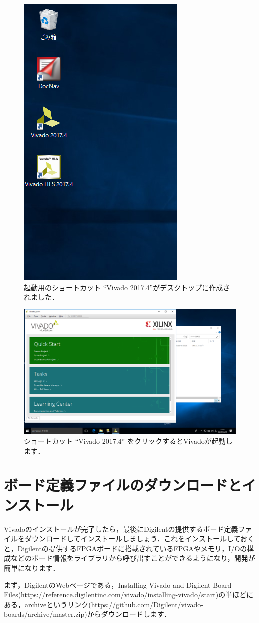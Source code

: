 \documentclass[a4paper,dvipdfmx]{jsarticle}
\begin{document}
 \begin{figure}[H]
  \begin{center}
   \includegraphics[width=.3\textwidth]{appendix_figures/17_installed_vivado.png}
   \caption{起動用のショートカット ``Vivado 2017.4''がデスクトップに作成されました．}
  \end{center}
 \end{figure}

 \begin{figure}[H]
  \begin{center}
   \includegraphics[width=.3\textwidth]{appendix_figures/18_installed_vivado.png}
   \caption{ショートカット ``Vivado 2017.4'' をクリックするとVivadoが起動します．}
  \end{center}
 \end{figure}

\section{ボード定義ファイルのダウンロードとインストール}
Vivadoのインストールが完了したら，最後にDigilentの提供するボード定義ファイルをダウンロードしてインストールしましょう．これをインストールしておくと，Digilentの提供するFPGAボードに搭載されているFPGAやメモリ，I/Oの構成などのボード情報をライブラリから呼び出すことができるようになり，開発が簡単になります．

まず，DigilentのWebページである，Installing Vivado and Digilent Board Files(\url{https://reference.digilentinc.com/vivado/installing-vivado/start})の半ほどにある，archiveというリンク(https://github.com/Digilent/vivado-boards/archive/master.zip)からダウンロードします．
\end{document}
